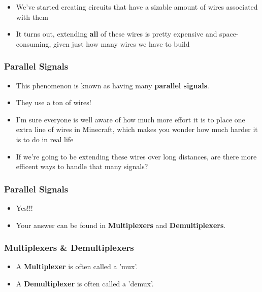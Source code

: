 \documentclass{beamer}
\begin{document}
\begin{frame}
\begin{tikzpicture}[x=0.75pt,y=0.75pt,yscale=-1,xscale=1]
\end{tikzpicture}


			\begin{itemize}
				\item We've started creating circuits that have a sizable amount of wires associated with them
				\item It turns out, extending \textbf{all} of these wires is pretty expensive and space-consuming, given just how many wires we have to build
			\end{itemize}
			
			
			

		\end{frame}	
		
		
		\begin{frame}
			\frametitle{Parallel Signals}
			\begin{itemize}
				\item This phenomenon is known as having many \textbf{parallel signals}.
				\item They use a ton of wires!
				\item I'm sure everyone is well aware of how much more effort it is to place one extra line of wires in Minecraft, which makes you wonder how much harder it is to do in real life
				\item If we're going to be extending these wires over long distances, are there more efficent ways to handle that many signals?
			\end{itemize}
		\end{frame}	
		
		\begin{frame}
			\frametitle{Parallel Signals}
			\begin{itemize}
				\item Yes!!!
				\item Your answer can be found in \textbf{Multiplexers} and \textbf{Demultiplexers}.
			\end{itemize}
		\end{frame}		
    	
    	\begin{frame}
    		\frametitle{Multiplexers \& Demultiplexers}
    		
    		\begin{itemize}
    			\item A \textbf{Multiplexer} is often called a 'mux'.
    			\item A \textbf{Demultiplexer} is often called a 'demux'.
    		\end{itemize}
    		
		\end{frame}  
		
\end{document}
